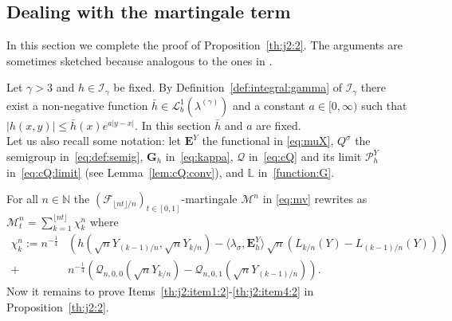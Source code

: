 \documentclass[12pt]{article}
\numberwithin{equation}{section}
\theoremstyle{definition}
\theoremstyle{remark}
\newcommand{\NN}{\mathbb{N}}
\newcommand{\cM}{\mathcal{M}}
\newcommand{\cQ}{\mathcal{Q}}
\newcommand{\cF}{\mathcal{F}}
\newcommand{\Lgb}[1]{\mathcal{L}^{1}_{b}(\lambda^{(#1)})}
\newcommand{\Lg}[1]{\mathcal{I}_{#1}}
\newcommand{\bfH}[1]{\mathbf{E}^Y_{#1}}
\newcommand{\bfG}[1]{\mathbf{G}_{#1}}
\begin{document}
\subsection{Dealing with the martingale term} \label{sec:th:j2:hp}
In this section we complete the proof of Proposition~\ref{th:j2:2}. The arguments are sometimes sketched because analogous to the ones in \cite[Section~6]{j1}.

Let $\gamma >3$ and $h\in \Lg{\gamma}$ be fixed.
By Definition~\ref{def:integral:gamma} of $\Lg{\gamma}$ there exist a non-negative function $\bar h \in \Lgb{\gamma}$ and a constant $a\in[0,\infty)$ such that $|h(x,y)| \leq \bar h(x) e^{a |y-x|}$. In this section $\bar h$ and $a$ are fixed.
\\
Let us also recall some notation: let $\bfH{}$ the functional in \eqref{eq:muX}, 
$Q^\sigma$ the semigroup in~\eqref{eq:def:semig}, 
$\bfG{h}$ in~\eqref{eq:kappa}, 
$\cQ$ in~\eqref{eq:cQ} and its limit $\mathcal{P}_{h}^{Y}$ in~\eqref{eq:cQ:limit} (see Lemma~\ref{lem:cQ:conv}), and $\mathbb{L}$ in~\eqref{function:G}.

For all $n\in \NN$ the $(\cF_{\lfloor n t\rfloor /n})_{t\in [0,1]}$-martingale $\cM^n$ in \eqref{eq:mv} rewrites as
$
	{ \cM^n_t =  \sum_{k=1}^{\lfloor n t \rfloor} \chi^n_k}
$
where
\begin{equation} \label{eq:chi:nk}
\begin{split}
	\chi^n_k 
	:= 
	n^{-\frac14}  
	& \left( h(\sqrt{n} Y_{(k-1)/n}, \sqrt{n} Y_{k/n} ) -   \langle \lambda_\sigma , \bfH h \rangle \, \sqrt{n}(L_{k/n}(Y) - L_{(k-1)/n}(Y)) \right)
	 \\
	+ \, & n^{-\frac14}  \left(\cQ_{n,0,0}(\sqrt{n} Y_{k/n}) - \cQ_{n,0,1}(\sqrt{n} Y_{(k-1)/n})
	\right)\!.
\end{split}
\end{equation}
%
%
Now it remains to prove Items~\ref{th:j2:item1:2}-\ref{th:j2:item4:2} in Proposition~\ref{th:j2:2}. 
%
%
%
\end{document}

